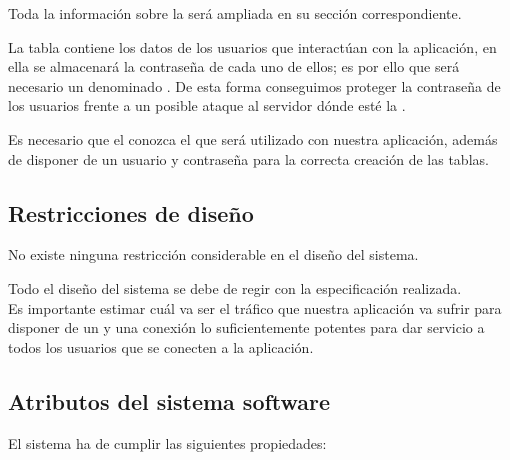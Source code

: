 Toda la información sobre la  será ampliada en su sección
correspondiente.

La tabla  contiene los datos de los usuarios que interactúan con
la aplicación, en ella se almacenará la contraseña de cada uno de ellos; es por
ello que será necesario un  denominado
. De esta forma conseguimos proteger la contraseña de los usuarios
frente a un posible ataque al servidor dónde esté la .

Es necesario que el  conozca el  que será
utilizado con nuestra aplicación, además de disponer de un usuario y contraseña
para la correcta creación de las tablas.

\subsection{Restricciones de diseño}

No existe ninguna restricción considerable en el diseño del sistema.

Todo el diseño del sistema se debe de regir con la especificación
realizada.\\

Es importante estimar cuál va ser el tráfico que nuestra aplicación va sufrir
para disponer de un  y una conexión lo suficientemente
potentes para dar servicio a todos los usuarios que se conecten a la aplicación.

\subsection{Atributos del sistema software}
El sistema ha de cumplir las siguientes propiedades:

